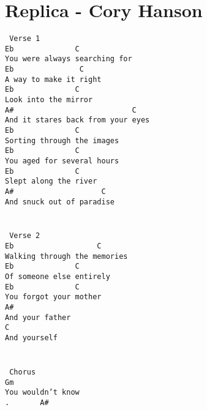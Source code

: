 \newpage
\section{Replica - Cory Hanson}
\label{Replica - Cory Hanson}
\texttt{\lbrack\ Verse\ 1\rbrack\\
Eb\ \ \ \ \ \ \ \ \ \ \ \ \ \ C\\
You\ were\ always\ searching\ for\\
Eb\ \ \ \ \ \ \ \ \ \ \ \ \ \ \ C\\
A\ way\ to\ make\ it\ right\\
Eb\ \ \ \ \ \ \ \ \ \ \ \ \ \ C\\
Look\ into\ the\ mirror\\
A\#\ \ \ \ \ \ \ \ \ \ \ \ \ \ \ \ \ \ \ \ \ \ \ \ \ \ \ C\\
And\ it\ stares\ back\ from\ your\ eyes\\
Eb\ \ \ \ \ \ \ \ \ \ \ \ \ \ C\\
Sorting\ through\ the\ images\\
Eb\ \ \ \ \ \ \ \ \ \ \ \ \ \ C\\
You\ aged\ for\ several\ hours\\
Eb\ \ \ \ \ \ \ \ \ \ \ \ \ \ C\\
Slept\ along\ the\ river\\
A\#\ \ \ \ \ \ \ \ \ \ \ \ \ \ \ \ \ \ \ \ C\\
And\ snuck\ out\ of\ paradise\\
\\
\\
\lbrack\ Verse\ 2\rbrack\\
Eb\ \ \ \ \ \ \ \ \ \ \ \ \ \ \ \ \ \ \ C\\
Walking\ through\ the\ memories\\
Eb\ \ \ \ \ \ \ \ \ \ \ \ \ \ C\\
Of\ someone\ else\ entirely\\
Eb\ \ \ \ \ \ \ \ \ \ \ \ \ \ C\\
You\ forgot\ your\ mother\\
A\#\\
And\ your\ father\\
C\\
And\ yourself\\
\\
\\
\lbrack\ Chorus\rbrack\\
Gm\\
You\ wouldn't\ know\\
. \ \ \ \ \ \ A\#\\
}
